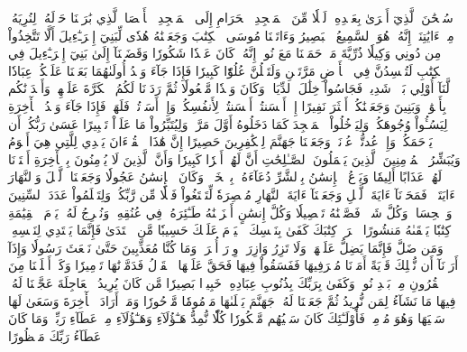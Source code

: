سُبۡحَٰنَ ٱلَّذِيٓ أَسۡرَىٰ بِعَبۡدِهِۦ لَيۡلٗا مِّنَ ٱلۡمَسۡجِدِ ٱلۡحَرَامِ إِلَى ٱلۡمَسۡجِدِ ٱلۡأَقۡصَا ٱلَّذِي بَٰرَكۡنَا حَوۡلَهُۥ لِنُرِيَهُۥ مِنۡ ءَايَٰتِنَآۚ إِنَّهُۥ هُوَ ٱلسَّمِيعُ ٱلۡبَصِيرُ
وَءَاتَيۡنَا مُوسَى ٱلۡكِتَٰبَ وَجَعَلۡنَٰهُ هُدٗى لِّبَنِيٓ إِسۡرَـٰٓءِيلَ أَلَّا تَتَّخِذُواْ مِن دُونِي وَكِيلٗا
ذُرِّيَّةَ مَنۡ حَمَلۡنَا مَعَ نُوحٍۚ إِنَّهُۥ كَانَ عَبۡدٗا شَكُورٗا
وَقَضَيۡنَآ إِلَىٰ بَنِيٓ إِسۡرَـٰٓءِيلَ فِي ٱلۡكِتَٰبِ لَتُفۡسِدُنَّ فِي ٱلۡأَرۡضِ مَرَّتَيۡنِ وَلَتَعۡلُنَّ عُلُوّٗا كَبِيرٗا
فَإِذَا جَآءَ وَعۡدُ أُولَىٰهُمَا بَعَثۡنَا عَلَيۡكُمۡ عِبَادٗا لَّنَآ أُوْلِي بَأۡسٖ شَدِيدٖ فَجَاسُواْ خِلَٰلَ ٱلدِّيَارِۚ وَكَانَ وَعۡدٗا مَّفۡعُولٗا
ثُمَّ رَدَدۡنَا لَكُمُ ٱلۡكَرَّةَ عَلَيۡهِمۡ وَأَمۡدَدۡنَٰكُم بِأَمۡوَٰلٖ وَبَنِينَ وَجَعَلۡنَٰكُمۡ أَكۡثَرَ نَفِيرًا
إِنۡ أَحۡسَنتُمۡ أَحۡسَنتُمۡ لِأَنفُسِكُمۡۖ وَإِنۡ أَسَأۡتُمۡ فَلَهَاۚ فَإِذَا جَآءَ وَعۡدُ ٱلۡأٓخِرَةِ لِيَسُـُٔواْ وُجُوهَكُمۡ وَلِيَدۡخُلُواْ ٱلۡمَسۡجِدَ كَمَا دَخَلُوهُ أَوَّلَ مَرَّةٖ وَلِيُتَبِّرُواْ مَا عَلَوۡاْ تَتۡبِيرًا
عَسَىٰ رَبُّكُمۡ أَن يَرۡحَمَكُمۡۚ وَإِنۡ عُدتُّمۡ عُدۡنَاۚ وَجَعَلۡنَا جَهَنَّمَ لِلۡكَٰفِرِينَ حَصِيرًا
إِنَّ هَٰذَا ٱلۡقُرۡءَانَ يَهۡدِي لِلَّتِي هِيَ أَقۡوَمُ وَيُبَشِّرُ ٱلۡمُؤۡمِنِينَ ٱلَّذِينَ يَعۡمَلُونَ ٱلصَّـٰلِحَٰتِ أَنَّ لَهُمۡ أَجۡرٗا كَبِيرٗا
وَأَنَّ ٱلَّذِينَ لَا يُؤۡمِنُونَ بِٱلۡأٓخِرَةِ أَعۡتَدۡنَا لَهُمۡ عَذَابًا أَلِيمٗا
وَيَدۡعُ ٱلۡإِنسَٰنُ بِٱلشَّرِّ دُعَآءَهُۥ بِٱلۡخَيۡرِۖ وَكَانَ ٱلۡإِنسَٰنُ عَجُولٗا
وَجَعَلۡنَا ٱلَّيۡلَ وَٱلنَّهَارَ ءَايَتَيۡنِۖ فَمَحَوۡنَآ ءَايَةَ ٱلَّيۡلِ وَجَعَلۡنَآ ءَايَةَ ٱلنَّهَارِ مُبۡصِرَةٗ لِّتَبۡتَغُواْ فَضۡلٗا مِّن رَّبِّكُمۡ وَلِتَعۡلَمُواْ عَدَدَ ٱلسِّنِينَ وَٱلۡحِسَابَۚ وَكُلَّ شَيۡءٖ فَصَّلۡنَٰهُ تَفۡصِيلٗا
وَكُلَّ إِنسَٰنٍ أَلۡزَمۡنَٰهُ طَـٰٓئِرَهُۥ فِي عُنُقِهِۦۖ وَنُخۡرِجُ لَهُۥ يَوۡمَ ٱلۡقِيَٰمَةِ كِتَٰبٗا يَلۡقَىٰهُ مَنشُورًا
ٱقۡرَأۡ كِتَٰبَكَ كَفَىٰ بِنَفۡسِكَ ٱلۡيَوۡمَ عَلَيۡكَ حَسِيبٗا
مَّنِ ٱهۡتَدَىٰ فَإِنَّمَا يَهۡتَدِي لِنَفۡسِهِۦۖ وَمَن ضَلَّ فَإِنَّمَا يَضِلُّ عَلَيۡهَاۚ وَلَا تَزِرُ وَازِرَةٞ وِزۡرَ أُخۡرَىٰۗ وَمَا كُنَّا مُعَذِّبِينَ حَتَّىٰ نَبۡعَثَ رَسُولٗا
وَإِذَآ أَرَدۡنَآ أَن نُّهۡلِكَ قَرۡيَةً أَمَرۡنَا مُتۡرَفِيهَا فَفَسَقُواْ فِيهَا فَحَقَّ عَلَيۡهَا ٱلۡقَوۡلُ فَدَمَّرۡنَٰهَا تَدۡمِيرٗا
وَكَمۡ أَهۡلَكۡنَا مِنَ ٱلۡقُرُونِ مِنۢ بَعۡدِ نُوحٖۗ وَكَفَىٰ بِرَبِّكَ بِذُنُوبِ عِبَادِهِۦ خَبِيرَۢا بَصِيرٗا
مَّن كَانَ يُرِيدُ ٱلۡعَاجِلَةَ عَجَّلۡنَا لَهُۥ فِيهَا مَا نَشَآءُ لِمَن نُّرِيدُ ثُمَّ جَعَلۡنَا لَهُۥ جَهَنَّمَ يَصۡلَىٰهَا مَذۡمُومٗا مَّدۡحُورٗا
وَمَنۡ أَرَادَ ٱلۡأٓخِرَةَ وَسَعَىٰ لَهَا سَعۡيَهَا وَهُوَ مُؤۡمِنٞ فَأُوْلَـٰٓئِكَ كَانَ سَعۡيُهُم مَّشۡكُورٗا
كُلّٗا نُّمِدُّ هَـٰٓؤُلَآءِ وَهَـٰٓؤُلَآءِ مِنۡ عَطَآءِ رَبِّكَۚ وَمَا كَانَ عَطَآءُ رَبِّكَ مَحۡظُورًا
